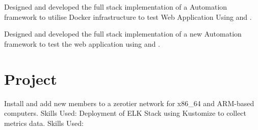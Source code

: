 \documentclass[]{resume-dark}
\begin{document}
\begin{minipage}[t]{0.66\textwidth}
\begin{tightemize}
\item Designed and developed the full stack implementation of a Automation framework to utilise Docker infrastructure to test Web Application Using  and .
\end{tightemize}
\sectionsep
{}
\begin{tightemize}
\item Designed and developed the full stack implementation of a new Automation framework to test the web application using  and .
\end{tightemize}
\sectionsep


\section{Project}
Install and add new members to a zerotier network for x86\_64 and ARM-based computers.
\newline
Skills Used: 
\sectionsep
{}
Deployment of ELK Stack using Kustomize to collect metrics data.
\newline
Skills Used: 
\sectionsep



\end{minipage} 
\end{document}
